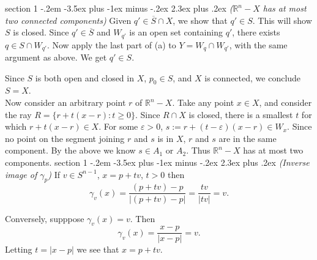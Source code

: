 \documentclass[12pt]{article}
\makeatletter
\theoremstyle{norm}
\newcommand{\R}[0]{\mathbb{R}}
\newcommand{\ga}[0]{\gamma}
\newcommand{\ep}[0]{\varepsilon}
\newcommand{\ol}[1]{\overline{#1}}
\newenvironment{problem}{\@startsection
       {section}
       {1}
       {-.2em}
       {-3.5ex plus -1ex minus -.2ex}
       {2.3ex plus .2ex}
       {\pagebreak[3]%
       \large\bf\noindent{Problem }
       }
       }
       {%
       }
\makeatother
\begin{document}
\begin{problem}{\it ($\R^n-X$ has at most two connected components)}
Given $q'\in \ol{S}\cap X$, we show that $q'\in S$. This will show $S$ is closed. Since $q'\in \ol{S}$ and $W_{q'}$ is an open set containing $q'$, there exists $q\in S\cap W_{q'}$. 
Now apply the last part of (a) to $Y=W_q\cap W_{q'}$, with the same argument as above. We get $q'\in S$.

Since $S$ is both open and closed in $X$, $p_0\in S$, and $X$ is connected, we conclude $S=X$.\\

Now consider an arbitrary point $r$ of $\R^n-X$. Take any point $x\in X$, and consider the ray $R=\{r+t(x-r):t\ge 0\}$. Since $R\cap X$ is closed, there is a smallest $t$ for which $r+t(x-r)\in X$. For some $\ep>0$, $s:=r+(t-\ep)(x-r)\in W_x$. Since no point on the segment joining $r$ and $s$ is in $X$, $r$ and $s$ are in the same component. By the above we know $s\in A_1$ or $A_2$. Thus $\R^n-X$ has at most two components.
\end{problem}
\begin{problem}{\it(Inverse image of $\ga_p$)}
If $v\in S^{n-1}$, $x=p+tv$, $t>0$ then
\[
\ga_v(x)=\frac{(p+tv)-p}{|(p+tv)-p|}=\frac{tv}{|tv|}=v.
\]

Conversely, supppose $\ga_v(x)=v$. Then
\[
\ga_v(x)=\frac{x-p}{|x-p|}=v.
\]
Letting $t=|x-p|$ we see that $x=p+tv$.
\end{problem}
\end{document}
